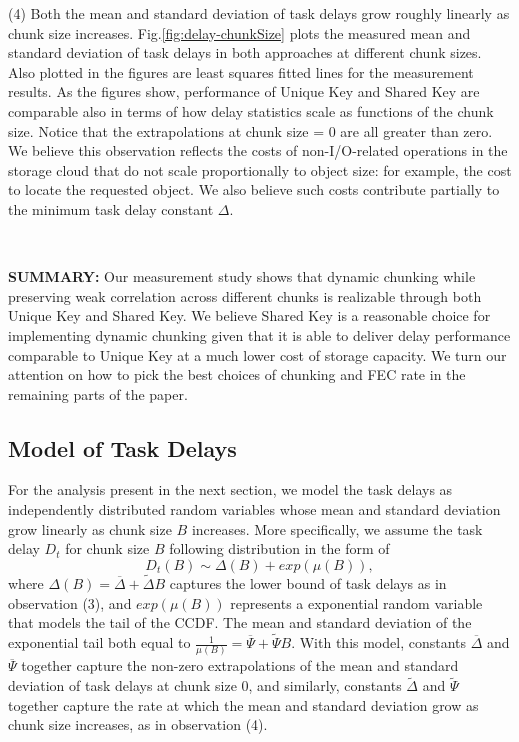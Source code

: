 \documentclass[journal]{IEEEtran}
\newcommand{\fixedDelta}{\overline{\Delta}}
\newcommand{\linearDelta}{\widetilde{\Delta}}
\newcommand{\fixedExp}{\overline{\Psi}}
\newcommand{\linearExp}{\widetilde{\Psi}}
\begin{document}
(4)
\label{obs:linearGroth}
Both the mean and standard deviation of task delays grow roughly linearly as chunk size increases. Fig.\ref{fig:delay-chunkSize} plots the measured mean and standard deviation of task delays in both approaches at different chunk sizes. Also plotted in the figures are least squares fitted lines for the measurement results. As the figures show, performance of Unique Key and Shared Key are comparable also in terms of how delay statistics scale as functions of the chunk size. Notice that the extrapolations at chunk size = 0 are all greater than zero. We believe this observation reflects the costs of non-I/O-related operations in the storage cloud that do not scale proportionally to object size: for example, the cost to locate the requested object. We also believe such costs contribute partially to the minimum task delay constant $\Delta$.

~

\noindent
{\bf SUMMARY:}
Our measurement study shows that dynamic chunking while preserving weak correlation across different chunks is realizable through both Unique Key and Shared Key. We believe Shared Key is a reasonable choice for implementing dynamic chunking given that it is able to deliver delay performance comparable to Unique Key at a much lower cost of storage capacity. We turn our attention on how to pick the best choices of chunking and FEC rate in the remaining parts of the paper. 

\subsection{Model of Task Delays}
\label{ssec:model:delay}
For the analysis present in the next section,
we model the task delays as independently distributed random variables whose mean and standard deviation grow linearly as chunk size $B$ increases. More specifically, we assume the task delay $D_t$ for chunk size $B$ following distribution in the form of 
\begin{equation}
D_t(B) \sim \Delta(B) + exp(\mu(B)),
\end{equation}
where 
$
\Delta(B) = \fixedDelta + \linearDelta B
$
captures the lower bound of task delays as in observation (3), and $exp(\mu(B))$ represents a exponential random variable that models the tail of the CCDF. The mean and standard deviation of the exponential tail both equal to  
$
\frac{1}{\mu(B)} = \fixedExp + \linearExp B.
$
With this model, constants
$\fixedDelta$ and $\fixedExp$ together capture the non-zero extrapolations of the mean and standard deviation of task delays at chunk size 0, and similarly, constants $\linearDelta$ and $\linearExp$ together capture the rate at which the mean and standard deviation grow as chunk size increases, as in observation (4).
\end{document}
